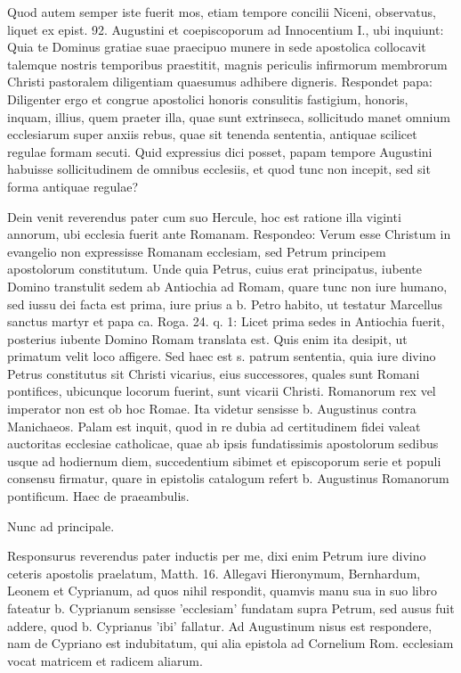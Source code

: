 Quod autem semper iste fuerit mos, etiam tempore concilii Niceni, observatus, liquet ex epist. 92. Augustini et coepiscoporum ad Innocentium I., ubi inquiunt: Quia te Dominus gratiae suae praecipuo munere in sede apostolica collocavit talemque nostris temporibus praestitit, magnis periculis infirmorum membrorum Christi pastoralem diligentiam quaesumus adhibere digneris. Respondet papa: Diligenter ergo et congrue apostolici honoris consulitis fastigium, honoris, inquam, illius, quem praeter illa, quae sunt extrinseca, sollicitudo manet omnium ecclesiarum super anxiis rebus, quae sit tenenda sententia, antiquae scilicet regulae formam secuti. Quid expressius dici posset, \marginpar{\small[292]} papam tempore Augustini habuisse sollicitudinem de omnibus ecclesiis, et quod tunc non incepit, sed sit forma antiquae regulae?

Dein venit reverendus pater cum suo Hercule, hoc est ratione illa viginti annorum, ubi ecclesia fuerit ante Romanam. Respondeo: Verum esse Christum in evangelio non expressisse Romanam ecclesiam, sed Petrum principem apostolorum constitutum. Unde quia Petrus, cuius erat principatus, iubente Domino transtulit sedem ab Antiochia ad Romam, quare tunc non iure humano, sed iussu dei facta est prima, iure prius a b. Petro habito, ut testatur Marcellus sanctus martyr et papa ca. Roga. 24. q. 1: Licet prima sedes in Antiochia fuerit, posterius iubente Domino Romam translata est. Quis enim ita desipit, ut primatum velit loco affigere. Sed haec est s. patrum sententia, quia iure divino Petrus constitutus sit Christi vicarius, eius successores, quales sunt Romani pontifices, ubicunque locorum fuerint, sunt vicarii Christi. Romanorum rex vel imperator non est ob hoc Romae. Ita videtur sensisse b. Augustinus contra Manichaeos. Palam est inquit, quod in re dubia ad certitudinem fidei valeat auctoritas ecclesiae catholicae, quae ab ipsis fundatissimis apostolorum sedibus usque ad hodiernum diem, succedentium sibimet et episcoporum serie et populi consensu firmatur, quare in epistolis catalogum refert b. Augustinus Romanorum pontificum. Haec de praeambulis.

Nunc ad principale.

Responsurus reverendus pater inductis per me, dixi enim Petrum iure divino ceteris apostolis praelatum, Matth. 16. Allegavi Hieronymum, Bernhardum, Leonem et Cyprianum, ad quos nihil respondit, quamvis manu sua in suo libro fateatur b. Cyprianum sensisse 'ecclesiam' fundatam supra Petrum, sed ausus fuit addere, quod b. Cyprianus 'ibi' fallatur. Ad Augustinum nisus est respondere, nam de Cypriano est indubitatum, qui alia epistola ad Cornelium Rom. ecclesiam vocat matricem et radicem aliarum.

